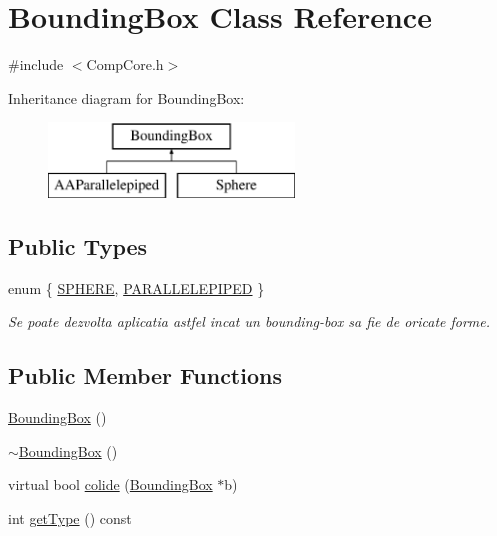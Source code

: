\hypertarget{class_bounding_box}{\section{Bounding\-Box Class Reference}
\label{class_bounding_box}
}


{\ttfamily \#include $<$Comp\-Core.\-h$>$}

Inheritance diagram for Bounding\-Box\-:\begin{figure}[H]
\begin{center}
\leavevmode
\includegraphics[height=2.000000cm]{class_bounding_box}
\end{center}
\end{figure}
\subsection*{Public Types}
\begin{DoxyCompactItemize}
\item 
enum \{ \hyperlink{class_bounding_box_ac4eb5027a54b684f95999bea905ce3e1a8d808e5d8708319c327450ed8cf4c335}{S\-P\-H\-E\-R\-E}, 
\hyperlink{class_bounding_box_ac4eb5027a54b684f95999bea905ce3e1ada5242406c5801cdb1d436b277503853}{P\-A\-R\-A\-L\-L\-E\-L\-E\-P\-I\-P\-E\-D}
 \}
\begin{DoxyCompactList}\small\item\em Se poate dezvolta aplicatia astfel incat un bounding-\/box sa fie de oricate forme. \end{DoxyCompactList}\end{DoxyCompactItemize}
\subsection*{Public Member Functions}
\begin{DoxyCompactItemize}
\item 
\hyperlink{class_bounding_box_a6e401c4da5839950f1f30c8b8c4d1208}{Bounding\-Box} ()
\item 
\hyperlink{class_bounding_box_a587de78331711c6eb6d15de867b73991}{$\sim$\-Bounding\-Box} ()
\item 
virtual bool \hyperlink{class_bounding_box_a071b4a72196249817f7678e596011f71}{colide} (\hyperlink{class_bounding_box}{Bounding\-Box} $\ast$b)
\item 
int \hyperlink{class_bounding_box_ae55e5dec2bfab0f338851af88e4980e5}{get\-Type} () const 
\end{DoxyCompactItemize}
